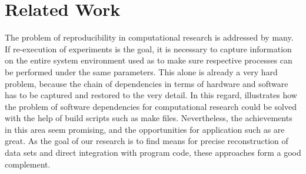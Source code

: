 \documentclass{acm_proc_article-sp}
\begin{document}
\section{Related Work}\label{sec:relatedwork}



The problem of reproducibility in computational research is addressed by many.
If re-execution of experiments is the goal, it is necessary to capture information on the entire system environment used as to make sure respective processes can be performed under the same parameters.
%
%
%
\cite{DBLP_conf_ercimdl_Rauber12}
\cite{Rechert_2010_EBS_1816123_1816182}
This alone is already a very hard problem, because the chain of dependencies in terms of hardware and software has to be captured and restored to the very detail.
In this regard, \cite{Schwab_2000_MSC_369545_369555} illustrates how the problem of software dependencies for computational research could be solved with the help of build scripts such as make files.
Nevertheless, the achievements in this area seem promising, and the opportunities for application such as  
%
%
%
\cite{Nowakowski2011608} %
%
are great. %
As the goal of our research is to find means for precise reconstruction of data sets and direct integration with program code, these approaches form a good complement. %
\end{document}
